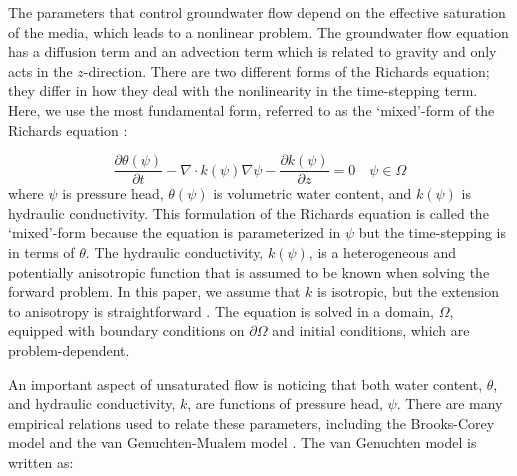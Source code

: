 \documentclass[preprint,review,3p,times,onecolumn,authoryear]{elsarticle}
\newcommand{\GRAD}{\nabla}
\begin{document}
The parameters that control groundwater flow depend on the effective saturation of the media, which leads to a nonlinear problem. The groundwater flow equation has a diffusion term and an advection term which is related to gravity and only acts in the $z$-direction. There are two different forms of the Richards equation; they differ in how they deal with the nonlinearity in the time-stepping term. Here, we use the most fundamental form, referred to as the `mixed'-form of the Richards equation \citep{Celia1990}:


\begin{equation}
\label{eq:richards-mixed}
    \frac{\partial \theta(\psi)}{\partial t} - \nabla \cdot k(\psi) \nabla \psi - \frac{\partial k(\psi)}{\partial z} = 0
    \quad \psi \in \Omega
\end{equation}
where $\psi$ is pressure head, $\theta(\psi)$ is volumetric water content, and $k(\psi)$ is hydraulic conductivity. This formulation of the Richards equation is called the `mixed'-form because the equation is parameterized in $\psi$ but the time-stepping is in terms of $\theta$. The hydraulic conductivity, $k(\psi)$, is a heterogeneous and potentially anisotropic function that is assumed to be known when solving the forward problem. In this paper, we assume that $k$ is isotropic, but the extension to anisotropy is straightforward \citep{simpeg2015, fvtutorial}. The equation is solved in a domain, $\Omega$, equipped with boundary conditions on $\partial \Omega$ and initial conditions, which are problem-dependent.


An important aspect of unsaturated flow is noticing that both water content, $\theta$, and hydraulic conductivity, $k$, are functions of pressure head, $\psi$. There are many empirical relations used to relate these parameters, including the Brooks-Corey model \citep{Brooks1964} and the van Genuchten-Mualem model \citep{Mualem1976, VanGenuchten1980}. The van Genuchten model is written as:
\end{document}

